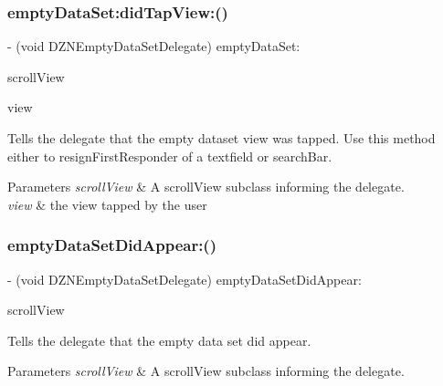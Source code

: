 \subsubsection{\texorpdfstring{empty\+Data\+Set\+:did\+Tap\+View\+:()}{emptyDataSet:didTapView:()}}
{\footnotesize\ttfamily -\/ (void D\+Z\+N\+Empty\+Data\+Set\+Delegate) empty\+Data\+Set\+: \begin{DoxyParamCaption}\item[{(U\+I\+Scroll\+View $\ast$)}]{scroll\+View }\item[{didTapView:(U\+I\+View $\ast$)}]{view }\end{DoxyParamCaption}\hspace{0.3cm}{\ttfamily [optional]}}

Tells the delegate that the empty dataset view was tapped. Use this method either to resign\+First\+Responder of a textfield or search\+Bar.


\begin{DoxyParams}{Parameters}
{\em scroll\+View} & A scroll\+View subclass informing the delegate. \\
\hline
{\em view} & the view tapped by the user \\
\hline
\end{DoxyParams}
\mbox{\label{protocol_d_z_n_empty_data_set_delegate_01-p_aa036ba06216e33dd8e3eac2cb03768ee}} 
\subsubsection{\texorpdfstring{empty\+Data\+Set\+Did\+Appear\+:()}{emptyDataSetDidAppear:()}}
{\footnotesize\ttfamily -\/ (void D\+Z\+N\+Empty\+Data\+Set\+Delegate) empty\+Data\+Set\+Did\+Appear\+: \begin{DoxyParamCaption}\item[{(U\+I\+Scroll\+View $\ast$)}]{scroll\+View }\end{DoxyParamCaption}\hspace{0.3cm}{\ttfamily [optional]}}

Tells the delegate that the empty data set did appear.


\begin{DoxyParams}{Parameters}
{\em scroll\+View} & A scroll\+View subclass informing the delegate. \\
\hline
\end{DoxyParams}
\mbox{\label{protocol_d_z_n_empty_data_set_delegate_01-p_a3831c92d486ed1fdd4dd6b3770f5368b}} 
